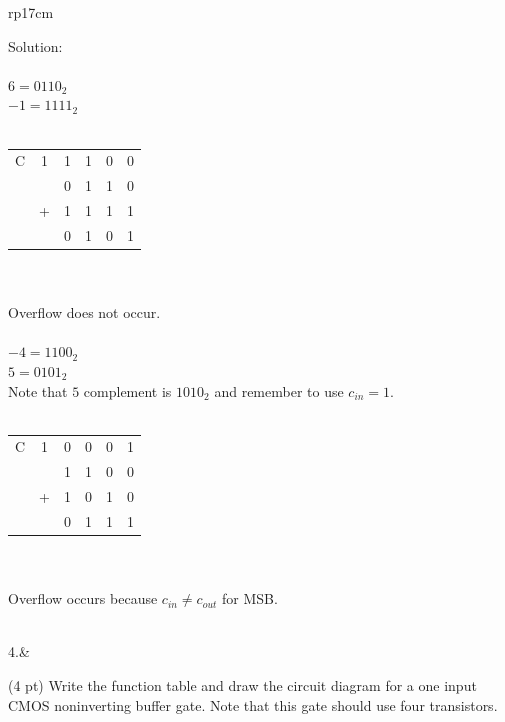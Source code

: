 \documentclass{article}
\begin{document}
\begin{longtable}[l]{rp{17cm}}
\begin{minipage}[t]{\linewidth}
Solution: \\
\\
$6 = 0110_2$\\
$-1 = 1111_2$\\
\\
\begin{tabular}{cccccc}
  C & 1 & 1 & 1 & 0 & 0 \\
    &   & 0 & 1 & 1 & 0 \\
    & + & 1 & 1 & 1 & 1 \\
  \hline
    &   & 0 & 1 & 0 & 1 \\
\end{tabular} \\
\\
Overflow does not occur.\\
\\
$-4 = 1100_2$\\
$5 = 0101_2$\\
Note that $5$ complement is $1010_2$ and remember to use $c_{in}=1$.\\
\\
\begin{tabular}{cccccc}
  C & 1 & 0 & 0 & 0 & 1 \\
    &   & 1 & 1 & 0 & 0 \\
    & + & 1 & 0 & 1 & 0 \\
  \hline
    &   & 0 & 1 & 1 & 1 \\
\end{tabular} \\
\\
Overflow occurs because $c_{in} \neq c_{out}$ for MSB.\\
\end{minipage}\\
\medskip
4.&\begin{minipage}[t]{\linewidth}(4 pt) Write the function table and draw the circuit diagram for a one input CMOS noninverting buffer gate.  Note that this gate should use four transistors.\\ \\


\end{minipage}
\end{longtable}
\end{document}
